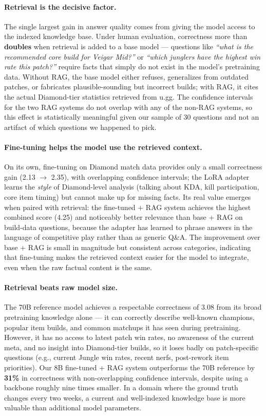 \documentclass[fleqn,moreauthors,10pt]{ds_report}
\begin{document}
\paragraph{Retrieval is the decisive factor.}
The single largest gain in answer quality comes from giving the model access to the indexed knowledge base. Under human evaluation, correctness more than \textbf{doubles} when retrieval is added to a base model — questions like \textit{``what is the recommended core build for Veigar Mid?''} or \textit{``which junglers have the highest win rate this patch?''} require facts that simply do not exist in the model's pretraining data. Without RAG, the base model either refuses, generalizes from outdated patches, or fabricates plausible-sounding but incorrect builds; with RAG, it cites the actual Diamond-tier statistics retrieved from u.gg. The confidence intervals for the two RAG systems do not overlap with any of the non-RAG systems, so this effect is statistically meaningful given our sample of 30 questions and not an artifact of which questions we happened to pick.

\paragraph{Fine-tuning helps the model use the retrieved context.}
On its own, fine-tuning on Diamond match data provides only a small correctness gain (2.13 $\to$ 2.35), with overlapping confidence intervals; the LoRA adapter learns the \emph{style} of Diamond-level analysis (talking about KDA, kill participation, core item timing) but cannot make up for missing facts. Its real value emerges when paired with retrieval: the fine-tuned + RAG system achieves the highest combined score (4.25) and noticeably better relevance than base + RAG on build-data questions, because the adapter has learned to phrase answers in the language of competitive play rather than as generic Q\&A. The improvement over base + RAG is small in magnitude but consistent across categories, indicating that fine-tuning makes the retrieved context easier for the model to integrate, even when the raw factual content is the same.

\paragraph{Retrieval beats raw model size.}
The 70B reference model achieves a respectable correctness of 3.08 from its broad pretraining knowledge alone — it can correctly describe well-known champions, popular item builds, and common matchups it has seen during pretraining. However, it has no access to latest patch win rates, no awareness of the current meta, and no insight into Diamond-tier builds, so it loses badly on patch-specific questions (e.g., current Jungle win rates, recent nerfs, post-rework item priorities). Our 8B fine-tuned + RAG system outperforms the 70B reference by \textbf{31\%} in correctness with non-overlapping confidence intervals, despite using a backbone roughly nine times smaller. In a domain where the ground truth changes every two weeks, a current and well-indexed knowledge base is more valuable than additional model parameters.
\end{document}
